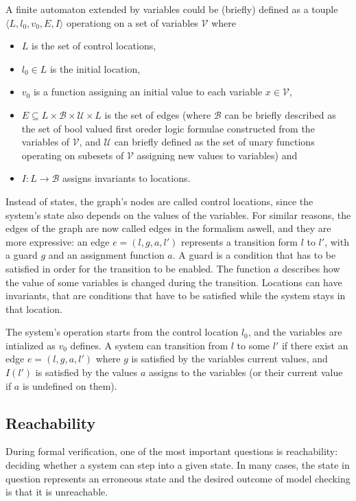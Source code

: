 A finite automaton extended by variables could be (briefly) defined as a touple $\langle L,l_0,v_0, E, I\rangle$ operationg on a set of variables $\mathcal{V}$ where
\begin{itemize}
	\item $L$ is the set of control locations,
	\item $l_0 \in L$ is the initial location,
	\item $v_0$ is a function assigning an initial value to each variable $x \in \mathcal{V}$,
	\item $E \subseteq L \times \mathcal{B} \times \mathcal{U} \times L$ is the set of edges (where $\mathcal{B}$ can be briefly described as the set of bool valued first oreder logic formulae constructed from the variables of $\mathcal{V}$,  and $\mathcal{U}$ can briefly defined as the set of unary functions operating on subesets of $\mathcal{V}$  assigning new values to variables) and
	\item $I: L \to \mathcal{B}$ assigns invariants to locations.
\end{itemize}

Instead of states, the graph's nodes are called control locations, since the system's state also depends on the values of the variables. For similar reasons, the edges of the graph are now called edges in the formalism aswell, and they are more expressive: an edge $e=(l,g,a,l')$ represents a transition form $l$ to $l'$, with a guard $g$ and an assignment function $a$. A guard is a condition that has to be satisfied in order for the transition to be enabled. The function $a$ describes how the value of some variables is changed during the transition. Locations can have invariants, that are conditions that have to be satisfied while the system stays in that location.

The system's operation starts from the control location $l_0$, and the variables are intialized as $v_0$ defines. A system can transition from $l$ to some $l'$ if there exist an edge $e=(l,g,a,l')$ where $g$ is satisfied by the variables current values, and $I(l')$ is satisfied by the values $a$ assigns to the variables (or their current value if $a$ is undefined on them).

\begin{example}
\end{example}

\subsection{Reachability}
During formal verification, one of the most important questions is reachability: deciding whether a system can step into a given state. In many cases, the state in question represents an erroneous state and the desired outcome of model checking is that it is unreachable.

